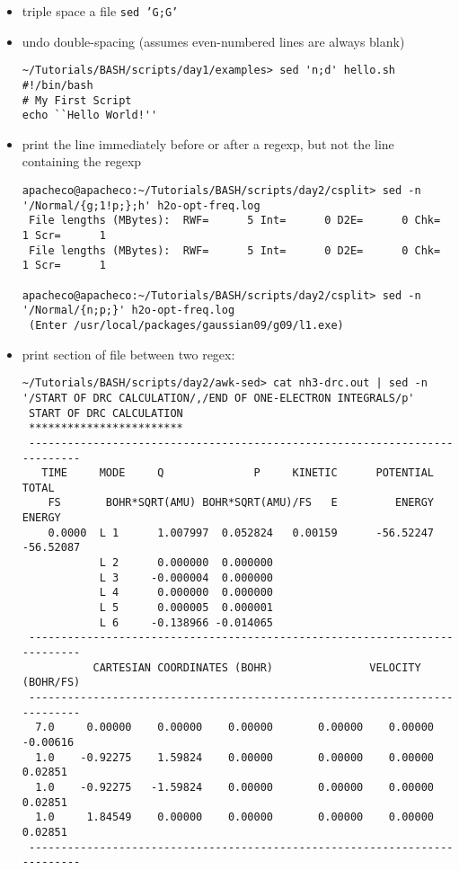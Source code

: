 \documentclass[10pt,t]{beamer}
\begin{document}
\begin{frame}
\begin{itemize}
\begin{lstlisting}[style=LINUX]
        \end{lstlisting}
      \item triple space a file \texttt{sed 'G;G'}
      \item  undo double-spacing (assumes even-numbered lines are always blank)
        \begin{lstlisting}[style=LINUX]
~/Tutorials/BASH/scripts/day1/examples> sed 'n;d' hello.sh 
#!/bin/bash
# My First Script
echo ``Hello World!''
        \end{lstlisting}
    \item print the line immediately before or after a regexp, but not the line containing the regexp
      \begin{lstlisting}[style=LINUX]
apacheco@apacheco:~/Tutorials/BASH/scripts/day2/csplit> sed -n '/Normal/{g;1!p;};h' h2o-opt-freq.log 
 File lengths (MBytes):  RWF=      5 Int=      0 D2E=      0 Chk=      1 Scr=      1
 File lengths (MBytes):  RWF=      5 Int=      0 D2E=      0 Chk=      1 Scr=      1

apacheco@apacheco:~/Tutorials/BASH/scripts/day2/csplit> sed -n '/Normal/{n;p;}' h2o-opt-freq.log 
 (Enter /usr/local/packages/gaussian09/g09/l1.exe)
      \end{lstlisting}
      \framebreak
    \item print section of file between two regex:
      \begin{lstlisting}[style=LINUX]
~/Tutorials/BASH/scripts/day2/awk-sed> cat nh3-drc.out | sed -n '/START OF DRC CALCULATION/,/END OF ONE-ELECTRON INTEGRALS/p'
 START OF DRC CALCULATION
 ************************
 ---------------------------------------------------------------------------
   TIME     MODE     Q              P     KINETIC      POTENTIAL          TOTAL
    FS       BOHR*SQRT(AMU) BOHR*SQRT(AMU)/FS   E         ENERGY         ENERGY
    0.0000  L 1      1.007997  0.052824   0.00159      -56.52247      -56.52087
            L 2      0.000000  0.000000
            L 3     -0.000004  0.000000
            L 4      0.000000  0.000000
            L 5      0.000005  0.000001
            L 6     -0.138966 -0.014065
 ---------------------------------------------------------------------------
           CARTESIAN COORDINATES (BOHR)               VELOCITY (BOHR/FS)
 ---------------------------------------------------------------------------
  7.0     0.00000    0.00000    0.00000       0.00000    0.00000   -0.00616
  1.0    -0.92275    1.59824    0.00000       0.00000    0.00000    0.02851
  1.0    -0.92275   -1.59824    0.00000       0.00000    0.00000    0.02851
  1.0     1.84549    0.00000    0.00000       0.00000    0.00000    0.02851
 ---------------------------------------------------------------------------


\end{lstlisting}
\end{itemize}
\end{frame}
\end{document}
